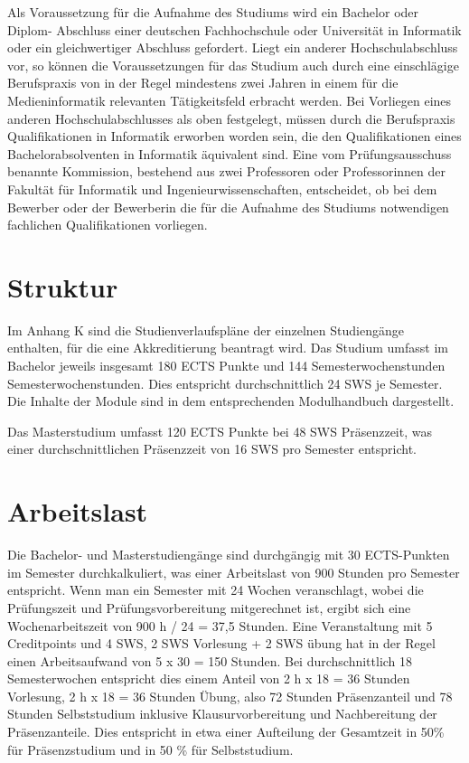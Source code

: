 Als Voraussetzung für die Aufnahme des Studiums wird ein Bachelor oder
Diplom- Abschluss einer deutschen Fachhochschule oder Universität in
Informatik oder ein gleichwertiger Abschluss gefordert. Liegt ein
anderer Hochschulabschluss vor, so können die Voraussetzungen für das
Studium auch durch eine einschlägige Berufspraxis von in der Regel
mindestens zwei Jahren in einem für die Medieninformatik relevanten
Tätigkeitsfeld erbracht werden. Bei Vorliegen eines anderen
Hochschulabschlusses als oben festgelegt, müssen durch die Berufspraxis
Qualifikationen in Informatik erworben worden sein, die den
Qualifikationen eines Bachelorabsolventen in Informatik äquivalent sind.
Eine vom Prüfungsausschuss benannte Kommission, bestehend aus zwei
Professoren oder Professorinnen der Fakultät für Informatik und
Ingenieurwissenschaften, entscheidet, ob bei dem Bewerber oder der
Bewerberin die für die Aufnahme des Studiums notwendigen fachlichen
Qualifikationen vorliegen.

\section{Struktur}\label{struktur}

Im Anhang K sind die Studienverlaufspläne der einzelnen Studiengänge
enthalten, für die eine Akkreditierung beantragt wird. Das Studium
umfasst im Bachelor jeweils insgesamt 180 ECTS Punkte und 144
Semesterwochenstunden Semesterwochenstunden. Dies entspricht
durchschnittlich 24 SWS je Semester. Die Inhalte der Module sind in dem
entsprechenden Modulhandbuch dargestellt.

Das Masterstudium umfasst 120 ECTS Punkte bei 48 SWS Präsenzzeit, was
einer durchschnittlichen Präsenzzeit von 16 SWS pro Semester entspricht.

\section{Arbeitslast}\label{arbeitslast}

Die Bachelor- und Masterstudiengänge sind durchgängig mit 30
ECTS-Punkten im Semester durchkalkuliert, was einer Arbeitslast von 900
Stunden pro Semester entspricht. Wenn man ein Semester mit 24 Wochen
veranschlagt, wobei die Prüfungszeit und Prüfungsvorbereitung
mitgerechnet ist, ergibt sich eine Wochenarbeitszeit von 900 h / 24 =
37,5 Stunden. Eine Veranstaltung mit 5 Creditpoints und 4 SWS, 2 SWS
Vorlesung + 2 SWS übung hat in der Regel einen Arbeitsaufwand von 5 x 30
= 150 Stunden. Bei durchschnittlich 18 Semesterwochen entspricht dies
einem Anteil von 2 h x 18 = 36 Stunden Vorlesung, 2 h x 18 = 36 Stunden
Übung, also 72 Stunden Präsenzanteil und 78 Stunden Selbststudium
inklusive Klausurvorbereitung und Nachbereitung der Präsenzanteile. Dies
entspricht in etwa einer Aufteilung der Gesamtzeit in 50\% für
Präsenzstudium und in 50 \% für Selbststudium.

